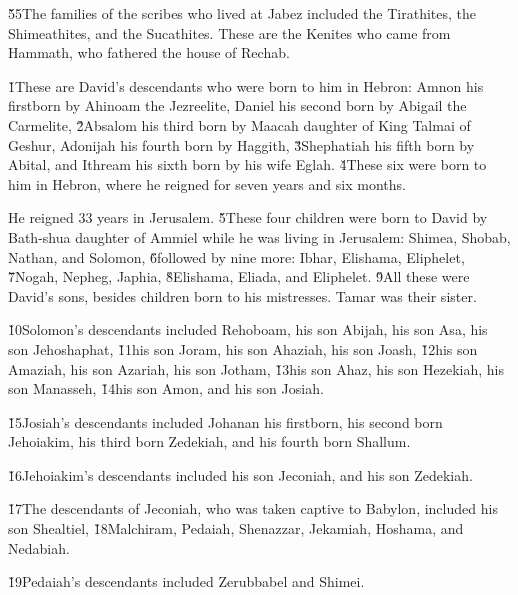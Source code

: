 \v{55}The families of the scribes who lived at Jabez included the Tirathites, the Shimeathites, and the Sucathites. These are the Kenites who came from Hammath, who fathered the house of Rechab.

\v{1}These are David's descendants who were born to him in Hebron: Amnon his firstborn by Ahinoam the Jezreelite, Daniel his second born by Abigail the Carmelite, \v{2}Absalom his third born by Maacah daughter of King Talmai of Geshur, Adonijah his fourth born by Haggith, \v{3}Shephatiah his fifth born by Abital, and Ithream his sixth born by his wife Eglah. \v{4}These six were born to him in Hebron, where he reigned for seven years and six months.

He reigned 33 years in Jerusalem. \v{5}These four children were born to David by Bath-shua daughter of Ammiel while he was living in Jerusalem: Shimea, Shobab, Nathan, and Solomon, \v{6}followed by nine more: Ibhar, Elishama, Eliphelet, \v{7}Nogah, Nepheg, Japhia, \v{8}Elishama, Eliada, and Eliphelet. \v{9}All these were David's sons, besides children born to his mistresses. Tamar was their sister.

\v{10}Solomon's descendants included Rehoboam, his son Abijah, his son Asa, his son Jehoshaphat, \v{11}his son Joram, his son Ahaziah, his son Joash, \v{12}his son Amaziah, his son Azariah, his son Jotham, \v{13}his son Ahaz, his son Hezekiah, his son Manasseh, \v{14}his son Amon, and his son Josiah.

\v{15}Josiah's descendants included Johanan his firstborn, his second born Jehoiakim, his third born Zedekiah, and his fourth born Shallum.

\v{16}Jehoiakim's descendants included his son Jeconiah, and his son Zedekiah.

\v{17}The descendants of Jeconiah, who was taken captive to Babylon, included his son Shealtiel, \v{18}Malchiram, Pedaiah, Shenazzar, Jekamiah, Hoshama, and Nedabiah.

\v{19}Pedaiah's descendants included Zerubbabel and Shimei.

